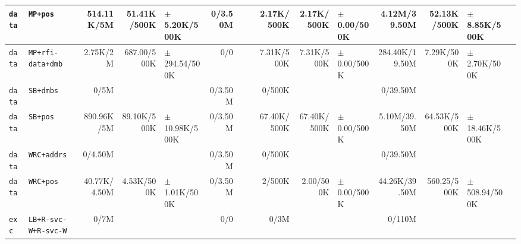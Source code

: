 \begin{tabular}{l l  | r r l | r r l | r r l | r r l l}
        \verb|data| &                                              \verb|MP+pos| &     514.11K/5M &           51.41K/500K &  $\pm$ 5.20K/500K &        0/3.50M &                       &                 &     2.17K/500K &            2.17K/500K &   $\pm$ 0.00/500K &   4.12M/39.50M &           52.13K/500K &  $\pm$ 8.85K/500K & \\ \hline 
        \verb|data| &                                     \verb|MP+rfi-data+dmb| &       2.75K/2M &           687.00/500K & $\pm$ 294.54/500K &            0/0 &                       &                 &     7.31K/500K &            7.31K/500K &   $\pm$ 0.00/500K & 284.40K/19.50M &            7.29K/500K &  $\pm$ 2.70K/500K & \\ \hline 
        \verb|data| &                                             \verb|SB+dmbs| &           0/5M &                       &                   &        0/3.50M &                       &                 &         0/500K &                       &                   &       0/39.50M &                       &                   & \\ \hline 
        \verb|data| &                                              \verb|SB+pos| &     890.96K/5M &           89.10K/500K & $\pm$ 10.98K/500K &        0/3.50M &                       &                 &    67.40K/500K &           67.40K/500K &   $\pm$ 0.00/500K &   5.10M/39.50M &           64.53K/500K & $\pm$ 18.46K/500K & \\ \hline 
        \verb|data| &                                           \verb|WRC+addrs| &        0/4.50M &                       &                   &        0/3.50M &                       &                 &         0/500K &                       &                   &       0/39.50M &                       &                   & \\ \hline 
        \verb|data| &                                             \verb|WRC+pos| &   40.77K/4.50M &            4.53K/500K &  $\pm$ 1.01K/500K &        0/3.50M &                       &                 &         2/500K &             2.00/500K &   $\pm$ 0.00/500K &  44.26K/39.50M &           560.25/500K & $\pm$ 508.94/500K & \\ \hline 
         \verb|exc| &                                  \verb|LB+R-svc-W+R-svc-W| &           0/7M &                       &                   &            0/0 &                       &                 &           0/3M &                       &                   &         0/110M &                       &                   & \\ \hline 

\end{tabular}
